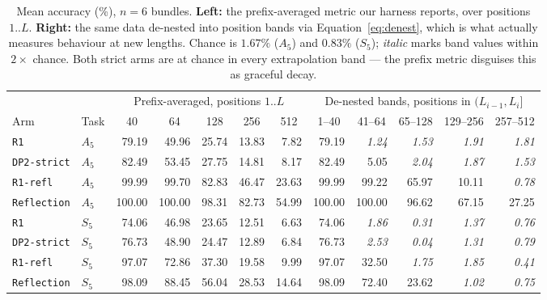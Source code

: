 \documentclass[10pt,twocolumn]{article}
\newcommand{\hd}[1]{\multicolumn{1}{c}{#1}}
\begin{document}
\begin{table}[t]
\centering
\small
\caption{Mean accuracy (\%), $n=6$ bundles. \textbf{Left:} the prefix-averaged
metric our harness reports, over positions $1..L$. \textbf{Right:} the same data
de-nested into position bands via Equation~\eqref{eq:denest}, which is what
actually measures behaviour at new lengths. Chance is $1.67\%$ ($A_5$) and
$0.83\%$ ($S_5$); \emph{italic} marks band values within $2\times$ chance. Both
strict arms are at chance in every extrapolation band --- the prefix metric
disguises this as graceful decay.}
\label{tab:bands}
\begin{tabular}{llrrrrr@{\hspace{2em}}rrrrr}
\toprule
& & \multicolumn{5}{c}{Prefix-averaged, positions $1..L$}
  & \multicolumn{5}{c}{De-nested bands, positions in $(L_{i-1},L_i]$} \\
\cmidrule(lr){3-7}\cmidrule(lr){8-12}
Arm & Task & \hd{40} & \hd{64} & \hd{128} & \hd{256} & \hd{512}
        & \hd{1--40} & \hd{41--64} & \hd{65--128} & \hd{129--256} & \hd{257--512} \\
\midrule
\texttt{R1}         & $A_5$ & 79.19 & 49.96 & 25.74 & 13.83 & 7.82
                    & 79.19 & \emph{1.24} & \emph{1.53} & \emph{1.91} & \emph{1.81} \\
\texttt{DP2-strict} & $A_5$ & 82.49 & 53.45 & 27.75 & 14.81 & 8.17
                    & 82.49 & 5.05 & \emph{2.04} & \emph{1.87} & \emph{1.53} \\
\texttt{R1-refl}    & $A_5$ & 99.99 & 99.70 & 82.83 & 46.47 & 23.63
                    & 99.99 & 99.22 & 65.97 & 10.11 & \emph{0.78} \\
\texttt{Reflection} & $A_5$ & 100.00 & 100.00 & 98.31 & 82.73 & 54.99
                    & 100.00 & 100.00 & 96.62 & 67.15 & 27.25 \\
\cmidrule(lr){1-12}
\texttt{R1}         & $S_5$ & 74.06 & 46.98 & 23.65 & 12.51 & 6.63
                    & 74.06 & \emph{1.86} & \emph{0.31} & \emph{1.37} & \emph{0.76} \\
\texttt{DP2-strict} & $S_5$ & 76.73 & 48.90 & 24.47 & 12.89 & 6.84
                    & 76.73 & \emph{2.53} & \emph{0.04} & \emph{1.31} & \emph{0.79} \\
\texttt{R1-refl}    & $S_5$ & 97.07 & 72.86 & 37.30 & 19.58 & 9.99
                    & 97.07 & 32.50 & \emph{1.75} & \emph{1.85} & \emph{0.41} \\
\texttt{Reflection} & $S_5$ & 98.09 & 88.45 & 56.04 & 28.53 & 14.64
                    & 98.09 & 72.40 & 23.62 & \emph{1.02} & \emph{0.75} \\
\bottomrule
\end{tabular}
\end{table}
\end{document}
